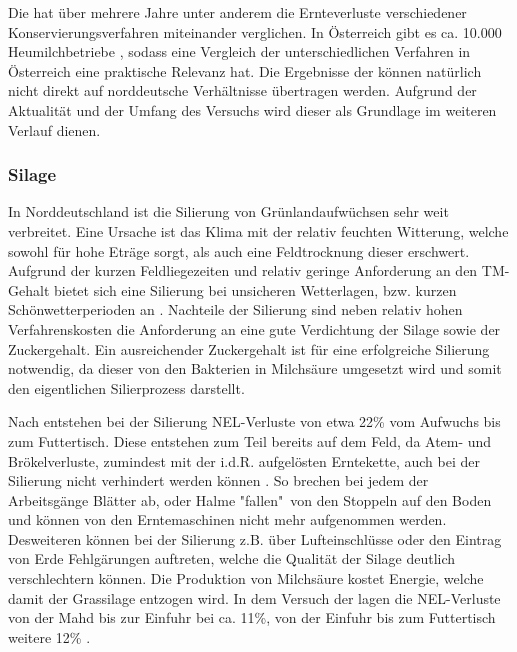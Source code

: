 Die \HBLFA hat über mehrere Jahre unter anderem die Ernteverluste verschiedener Konservierungsverfahren miteinander verglichen.
In Österreich gibt es ca. 10.000 Heumilchbetriebe \parencite[75]{fritz2018ansatz}, sodass eine Vergleich der unterschiedlichen Verfahren in Österreich eine praktische Relevanz hat.
Die Ergebnisse der \HBLFA können natürlich nicht direkt auf norddeutsche Verhältnisse übertragen werden.
Aufgrund der Aktualität und der Umfang des Versuchs wird dieser als Grundlage im weiteren Verlauf dienen.


\subsubsection{Silage}
\label{subsub:Silage}
In Norddeutschland ist die Silierung von Grünlandaufwüchsen sehr weit verbreitet.
Eine Ursache ist das Klima mit der relativ feuchten Witterung, welche sowohl für hohe Eträge sorgt, als auch eine Feldtrocknung dieser erschwert.
Aufgrund der kurzen Feldliegezeiten und relativ geringe Anforderung an den \ac{TM}-Gehalt bietet sich eine Silierung bei unsicheren Wetterlagen, bzw. kurzen Schönwetterperioden an \parencite[33f.]{fritz2018wirtschaftliche}. 
Nachteile der Silierung sind neben relativ hohen Verfahrenskosten die Anforderung an eine gute Verdichtung der Silage sowie der Zuckergehalt.
Ein ausreichender Zuckergehalt ist für eine erfolgreiche Silierung notwendig, da dieser von den Bakterien in Milchsäure umgesetzt wird und somit den eigentlichen Silierprozess darstellt.

Nach \textcite[30]{fritz2018wirtschaftliche} entstehen bei der Silierung \ac{NEL}-Verluste von etwa 22\% vom Aufwuchs bis zum Futtertisch.
Diese entstehen zum Teil bereits auf dem Feld, da Atem- und Brökelverluste, zumindest mit der i.d.R. aufgelösten Erntekette, auch bei der Silierung nicht verhindert werden können \parencite[58f]{gruber2015einfluss}.
So brechen bei jedem der Arbeitsgänge Blätter ab, oder Halme "fallen"\ von den Stoppeln auf den Boden und können von den Erntemaschinen nicht mehr aufgenommen werden.
Desweiteren können bei der Silierung z.B. über Lufteinschlüsse oder den Eintrag von Erde Fehlgärungen auftreten, welche die Qualität der Silage deutlich verschlechtern können.
Die Produktion von Milchsäure kostet Energie, welche damit der Grassilage entzogen wird\parencite[61]{gruber2015einfluss}.
In dem Versuch der \HBLFA lagen die \ac{NEL}-Verluste von der Mahd bis zur Einfuhr bei ca. 11\%, von der Einfuhr bis zum Futtertisch weitere 12\% \parencite[30]{fritz2018wirtschaftliche}.

